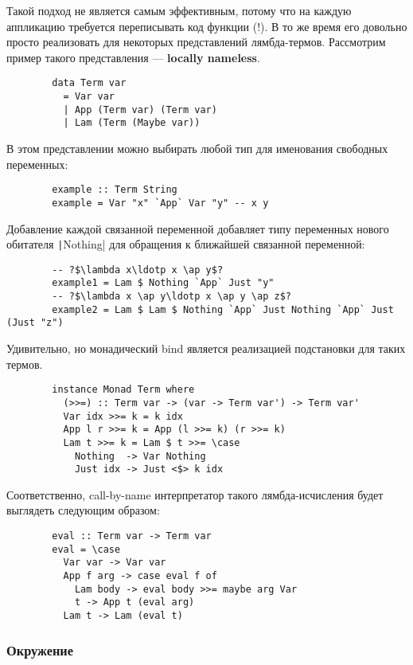 \documentclass[12pt]{article}
\newcommand{\vocab}[1]{\textbf{#1}} %
\newcommand{\ap}{~}
\begin{document}
    Такой подход не является самым эффективным, потому что на каждую аппликацию требуется переписывать код функции (!).
    В то же время его довольно просто реализовать для некоторых представлений лямбда-термов.
    Рассмотрим пример такого представления --- \vocab{locally nameless}.

    \begin{verbatim}
        data Term var
          = Var var
          | App (Term var) (Term var)
          | Lam (Term (Maybe var))
    \end{verbatim}

    В этом представлении можно выбирать любой тип для именования свободных переменных:
    \begin{verbatim}
        example :: Term String
        example = Var "x" `App` Var "y" -- x y
    \end{verbatim}
    Добавление каждой связанной переменной добавляет типу переменных нового обитателя \texttt|Nothing| для обращения к ближайшей связанной переменной:
    \begin{verbatim}
        -- ?$\lambda x\ldotp x \ap y$?
        example1 = Lam $ Nothing `App` Just "y"
        -- ?$\lambda x \ap y\ldotp x \ap y \ap z$?
        example2 = Lam $ Lam $ Nothing `App` Just Nothing `App` Just (Just "z")
    \end{verbatim}

    Удивительно, но монадический bind является реализацией подстановки для таких термов.

    \begin{verbatim}
        instance Monad Term where
          (>>=) :: Term var -> (var -> Term var') -> Term var'
          Var idx >>= k = k idx
          App l r >>= k = App (l >>= k) (r >>= k)
          Lam t >>= k = Lam $ t >>= \case
            Nothing  -> Var Nothing
            Just idx -> Just <$> k idx
    \end{verbatim}

    Соответственно, call-by-name интерпретатор такого лямбда-исчисления будет выглядеть следующим образом:

    \begin{verbatim}
        eval :: Term var -> Term var
        eval = \case
          Var var -> Var var
          App f arg -> case eval f of
            Lam body -> eval body >>= maybe arg Var
            t -> App t (eval arg)
          Lam t -> Lam (eval t)
    \end{verbatim}

    \subsubsection{Окружение}
\end{document}
